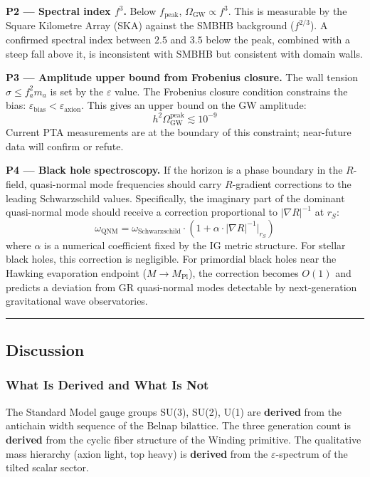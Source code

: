 \textbf{P2 --- Spectral index \(f^3\).} Below \(f_\text{peak}\),
\(\Omega_\text{GW} \propto f^3\). This is measurable by the Square
Kilometre Array (SKA) against the SMBHB background (\(f^{2/3}\)). A
confirmed spectral index between \(2.5\) and \(3.5\) below the peak,
combined with a steep fall above it, is inconsistent with SMBHB but
consistent with domain walls.

\textbf{P3 --- Amplitude upper bound from Frobenius closure.} The wall
tension \(\sigma \le f_a^2 m_a\) is set by the \(\varepsilon\) value.
The Frobenius closure condition constrains the bias:
\(\varepsilon_\text{bias} < \varepsilon_\text{axion}\). This gives an
upper bound on the GW amplitude:
\[h^2 \Omega_\text{GW}^\text{peak} \lesssim 10^{-9}\] Current PTA
measurements are at the boundary of this constraint; near-future data
will confirm or refute.

\textbf{P4 --- Black hole spectroscopy.} If the horizon is a phase
boundary in the \(R\)-field, quasi-normal mode frequencies should carry
\(R\)-gradient corrections to the leading Schwarzschild values.
Specifically, the imaginary part of the dominant quasi-normal mode
should receive a correction proportional to \(|\nabla R|^{-1}\) at
\(r_S\):
\[\omega_\text{QNM} = \omega_\text{Schwarzschild} \cdot \left(1 + \alpha \cdot |\nabla R|^{-1} \Big|_{r_S}\right)\]
where \(\alpha\) is a numerical coefficient fixed by the IG metric
structure. For stellar black holes, this correction is negligible. For
primordial black holes near the Hawking evaporation endpoint
(\(M \to M_\text{Pl}\)), the correction becomes \(O(1)\) and predicts a
deviation from GR quasi-normal modes detectable by next-generation
gravitational wave observatories.

\begin{center}\rule{0.5\linewidth}{0.5pt}\end{center}

\hypertarget{discussion}{%
\subsection{Discussion}\label{discussion}}

\hypertarget{what-is-derived-and-what-is-not}{%
\subsubsection{What Is Derived and What Is
Not}\label{what-is-derived-and-what-is-not}}

The Standard Model gauge groups SU(3), SU(2), U(1) are \textbf{derived}
from the antichain width sequence of the Belnap bilattice. The three
generation count is \textbf{derived} from the cyclic fiber structure of
the Winding primitive. The qualitative mass hierarchy (axion light, top
heavy) is \textbf{derived} from the \(\varepsilon\)-spectrum of the
tilted scalar sector.

